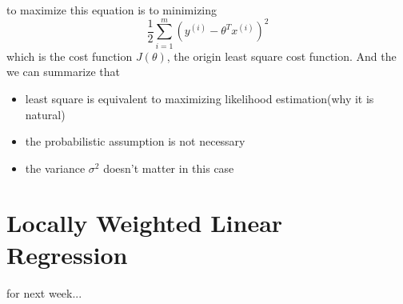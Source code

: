 \documentclass[10pt,a4paper,oneside]{article}
\begin{document}
to maximize this equation is to minimizing
\[
\frac{1}{2} \sum_{i=1}^{m} ( y^{(i)} - \theta^T x^{(i)})^2
\]
which is the cost function $J(\theta)$, the origin least square cost function. And the we can summarize that
\begin{itemize}
	\item least square is equivalent to maximizing likelihood estimation(why it is natural)
	\item the probabilistic assumption is not necessary
	\item the variance $\sigma^2$ doesn't matter in this case  
\end{itemize}

\section{Locally Weighted Linear Regression}
for next week...
\end{document}
